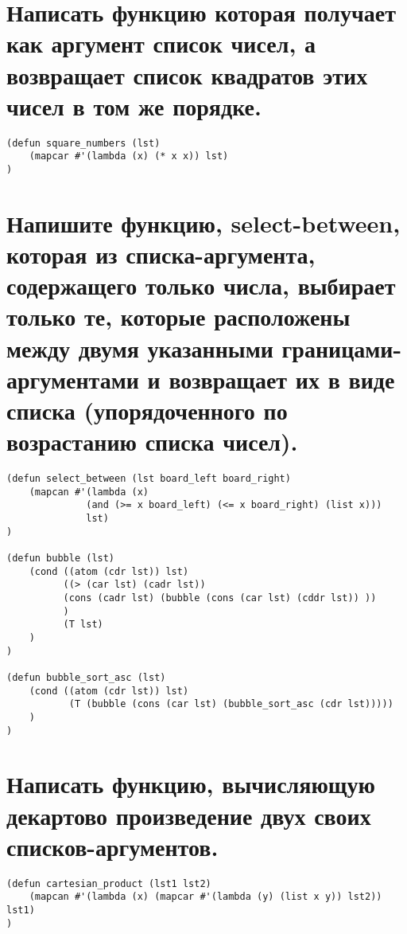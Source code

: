 \newpage
\section{Написать функцию которая получает как аргумент список чисел, а возвращает список квадратов этих чисел в том же порядке.}
\begin{lstlisting}[basicstyle=\footnotesize, caption={Задание 5}]
(defun square_numbers (lst)
	(mapcar #'(lambda (x) (* x x)) lst)
)
\end{lstlisting}

\section{Напишите функцию, select-between, которая из списка-аргумента, содержащего только числа, выбирает только те, которые расположены между двумя указанными границами-аргументами и возвращает их в виде списка (упорядоченного по возрастанию списка чисел).}
\begin{lstlisting}[basicstyle=\footnotesize, caption=Задание 6]
(defun select_between (lst board_left board_right)
	(mapcan #'(lambda (x) 
			  (and (>= x board_left) (<= x board_right) (list x)))
			  lst)
)

(defun bubble (lst)
	(cond ((atom (cdr lst)) lst)
		  ((> (car lst) (cadr lst)) 
		  (cons (cadr lst) (bubble (cons (car lst) (cddr lst)) ))
		  )
		  (T lst)
	)
)

(defun bubble_sort_asc (lst)
	(cond ((atom (cdr lst)) lst)
		   (T (bubble (cons (car lst) (bubble_sort_asc (cdr lst)))))
	)
)
\end{lstlisting}

\section{Написать функцию, вычисляющую декартово произведение двух своих списков-аргументов.}
\begin{lstlisting}[basicstyle=\footnotesize, caption={Задание 7}]
(defun cartesian_product (lst1 lst2)
	(mapcan #'(lambda (x) (mapcar #'(lambda (y) (list x y)) lst2)) lst1)
)
\end{lstlisting}

